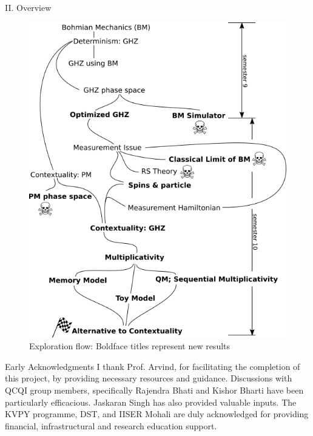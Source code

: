 \documentclass[final,hyperref={pdfpagelabels=false}]{beamer}
\begin{document}
\begin{frame}[t]
\begin{columns}[c]
\begin{column}{.31\textwidth}
\begin{block}{II. Overview}
            \begin{figure}
              \includegraphics[width=0.99\linewidth]{flow.png}
              \caption{Exploration flow: Boldface titles represent new results}
            \end{figure}

      \end{block}




      \begin{block}{Early Acknowledgments}
        I thank Prof. Arvind, for facilitating the completion of this project, by providing necessary resources and guidance. Discussions with QCQI group members, specifically Rajendra Bhati and Kishor Bharti have been particularly efficacious. Jaskaran Singh has also provided valuable inputs. The KVPY programme, DST, and IISER Mohali are duly acknowledged for providing financial, infrastructural and research education support.
      \end{block}


\end{column}
\end{columns}
\end{frame}
\end{document}
